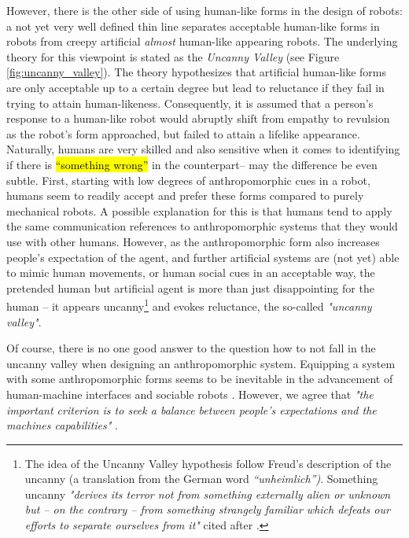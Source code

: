 \documentclass{frontiersSCNS} %
\begin{document}
However, there is the other side of using human-like forms in the design of robots: a not yet very well defined thin line separates acceptable human-like forms in robots from creepy artificial \textit{almost} human-like appearing robots. The underlying theory for this viewpoint is stated as the \textit{Uncanny Valley} \cite{mori_uncanny_1970} (see Figure \ref{fig:uncanny_valley}). The theory hypothesizes that artificial human-like forms are only acceptable up to a certain degree but lead to reluctance if they fail in trying to attain human-likeness. Consequently, it is assumed that a person's response to a human-like robot would abruptly shift from empathy to revulsion as the robot's form approached, but failed to attain a lifelike appearance. Naturally, humans are very skilled and also sensitive when it comes to identifying if there is \hl{``something wrong''} in the counterpart-- may the difference be even subtle. First, starting with low degrees of anthropomorphic cues in a robot, humans seem to readily accept and prefer these forms compared to purely mechanical robots. A possible explanation for this is that humans tend to apply the same communication references to anthropomorphic systems that they would use with other humans. However, as the anthropomorphic form also increases people's expectation of the agent, and further artificial systems are (not yet) able to mimic human movements, or human social cues in an acceptable way, the pretended human but artificial agent is more than just disappointing for the human -- it appears uncanny\footnote{The idea of the Uncanny Valley hypothesis follow Freud's description of the uncanny (a translation from the German word \textit{``unheimlich'')}. Something uncanny \textit{"derives its terror not from something externally alien or unknown but -- on the contrary -- from something strangely familiar which defeats our efforts to separate ourselves from it"} cited after \cite{hegel_understanding_2008}.} and evokes reluctance, the so-called \textit{"uncanny valley"}.

Of course, there is no one good answer to the question how to not fall in the uncanny valley when designing an anthropomorphic system. Equipping a system with some anthropomorphic forms seems to be inevitable \cite{duffy_anthropomorphism_2002} in the advancement of human-machine interfaces and sociable robots \citep{breazeal_sociable_2000}. However, we agree that \textit{"the important criterion is to seek a balance between people's expectations and the machines capabilities"} \citep{duffy_anthropomorphism_2002}. 
\end{document}
